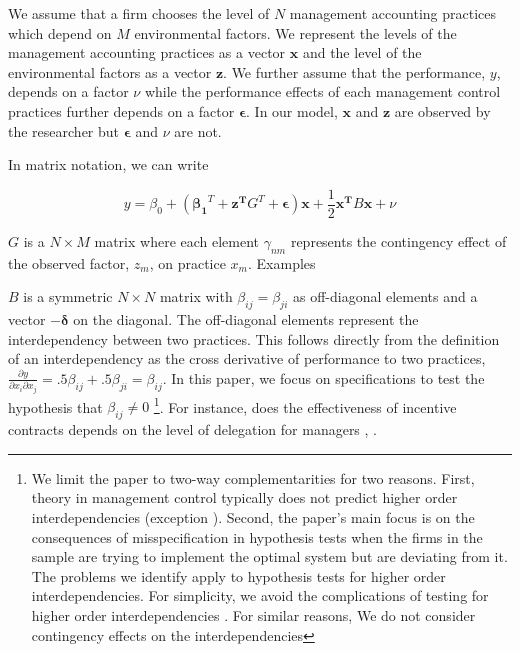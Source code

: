 \documentclass[12pt]{article}
\begin{document}
We assume that a firm chooses the level of $N$ management accounting practices which depend on $M$ environmental factors. We represent the levels of the management accounting practices as a vector $\mathbf{x}$ and the level of the environmental factors as a vector $\mathbf{z}$. We further assume that the performance, $y$, depends on a factor $\nu$ while the performance effects of each management control practices further depends on a factor $\mathbf{\epsilon}$. In our model, $\mathbf{x}$ and $\mathbf{z}$ are observed by the researcher but $\mathbf{\epsilon}$ and $\nu$ are not. 


In matrix notation, we can write

\begin{equation} \label{eq:structural-matrix}
y = \beta_0 + (\mathbf{\beta_1}^T + \mathbf{z^T} G^T + \mathbf{\epsilon})
     \mathbf{x} + \frac{1}{2}\mathbf{x^T} B \mathbf{x} + \nu
\end{equation}

$G$ is a $N \times M$ matrix where each element $\gamma_{nm}$ represents the contingency effect of the observed factor, $z_m$, on practice $x_m$. Examples

$B$ is a symmetric $N \times N$ matrix with $\beta_{ij} = \beta_{ji}$ as off-diagonal elements and a vector $-\mathbf{\delta}$ on the diagonal. The off-diagonal elements represent the interdependency between two practices. This follows directly from the definition of an interdependency as the cross derivative of performance to two practices, $\frac{\partial y}{\partial x_i \partial x_j} = .5 \beta_{ij} + .5 \beta_{ji} = \beta_{ij}$. In this paper, we focus on specifications to test the hypothesis that $\beta_{ij} \neq 0$ \footnote{We limit the paper to two-way complementarities for two reasons. First, theory in management control typically does not predict higher order interdependencies (exception \citet{Aral2012}). Second, the paper's main focus is on the consequences of misspecification in hypothesis tests when the firms in the sample are trying to implement the optimal system but are deviating from it. The problems we identify apply to hypothesis tests for higher order interdependencies. For simplicity, we avoid the complications of testing for higher order interdependencies \citep{Carree2011}. For similar reasons, We do not consider contingency effects on the interdependencies}. For instance, does the effectiveness of incentive contracts depends on the level of delegation for managers \citep{Moers2006}, .  
\end{document}
